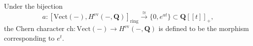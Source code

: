 Under the bijection
$$a \colon [\mathrm{Vect}(-), H^{\mathrm{ev}}(-, \mathbf{Q})]_{\text{ring}} \xrightarrow{\cong} \{0, e^{at}\} \subset \mathbf{Q}[[t]]_{+},$$
the Chern character $\mathrm{ch} \colon \mathrm{Vect}(-) \to H^{\mathrm{ev}}(-, \mathbf{Q})$ is defined to be the morphism corresponding to $e^t$.

